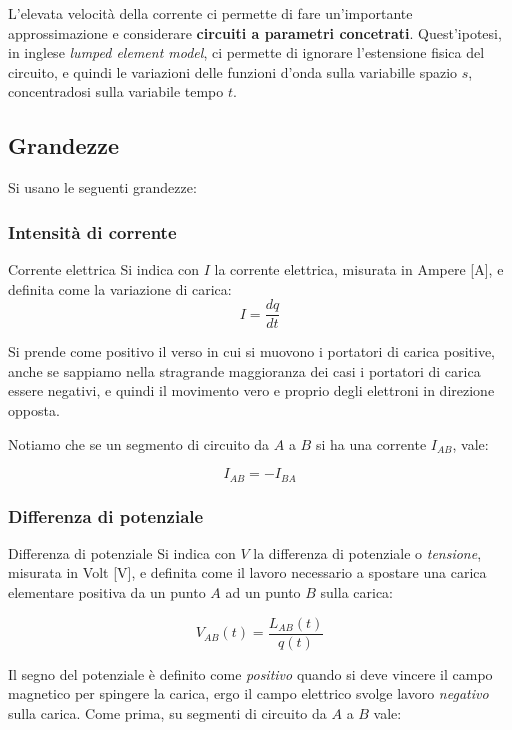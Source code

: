 \documentclass[a4paper,14pt]{memoir}
\begin{document}
L'elevata velocità della corrente ci permette di fare un'importante approssimazione e considerare \textbf{circuiti a parametri concetrati}.
Quest'ipotesi, in inglese \textit{lumped element model}, ci permette di ignorare l'estensione fisica del circuito, e quindi le variazioni delle funzioni d'onda sulla variabille spazio $s$, concentradosi sulla variabile tempo $t$.

\subsection{Grandezze}
Si usano le seguenti grandezze:
\subsubsection{Intensità di corrente}

\begin{definition}{Corrente elettrica}	
Si indica con $I$ la corrente elettrica, misurata in Ampere [$\mathrm{A}$], e definita come la variazione di carica:
$$
I = \frac{dq}{dt}
$$
\end{definition}

Si prende come positivo il verso in cui si muovono i portatori di carica positive, anche se sappiamo nella stragrande maggioranza dei casi i portatori di carica essere negativi, e quindi il movimento vero e proprio degli elettroni in direzione opposta.

Notiamo che se un segmento di circuito da $A$ a $B$ si ha una corrente $I_{AB}$, vale:

$$
I_{AB} = -I_{BA}
$$

\subsubsection{Differenza di potenziale}

\begin{definition}{Differenza di potenziale}
Si indica con $V$ la differenza di potenziale o \textit{tensione}, misurata in Volt [$\mathrm{V}$], e definita come il lavoro necessario a spostare una carica elementare positiva da un punto $A$ ad un punto $B$ sulla carica:

$$
	V_{AB}(t) = \frac{L_{AB}(t)}{q(t)}
$$
\end{definition}

Il segno del potenziale è definito come \textit{positivo} quando si deve vincere il campo magnetico per spingere la carica, ergo il campo elettrico svolge lavoro \textit{negativo} sulla carica.
Come prima, su segmenti di circuito da $A$ a $B$ vale:
\end{document}
